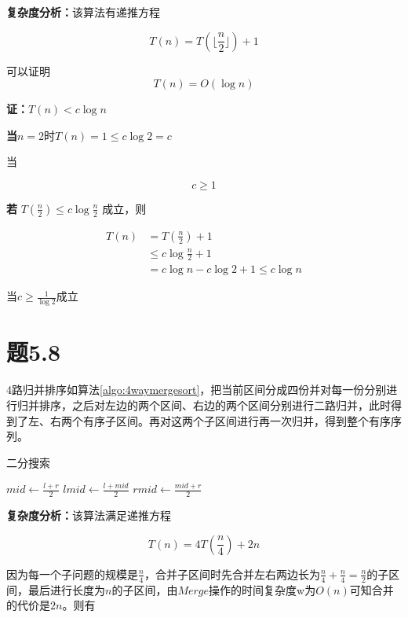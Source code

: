 \documentclass[a4paper,twoside]{article}
\begin{document}
\begin{spacing}{1.2}
\textbf{复杂度分析：}该算法有递推方程

$$
T(n)=T(\lfloor \frac{n}{2} \rfloor)+1
$$

可以证明
$$
T(n)=O(\log n)
$$

\textbf{证：}$T(n)<c\log n$

\textbf{当}$n=2$时$T(n)=1\le c\log2=c$

当

$$
c \ge 1
$$

\textbf{若}
$
T(\frac{n}{2}) \le c\log \frac{n}{2}
$
成立，则

\begin{align*}
	T(n)&=T(\frac{n}{2})+1 \\
	&\le c\log \frac{n}{2}+1 \\
	&= c\log n - c\log 2+1 \le c\log n
\end{align*}

当$
c \ge \frac{1}{\log 2}
$成立

\section{题5.8}

4路归并排序如算法\ref{algo:4waymergesort}，把当前区间分成四份并对每一份分别进行归并排序，之后对左边的两个区间、右边的两个区间分别进行二路归并，此时得到了左、右两个有序子区间。再对这两个子区间进行再一次归并，得到整个有序序列。

\begin{algorithm}
	\caption{二分搜索}
	\label{algo:4waymergesort}
	\begin{algorithmic}[1]
		\State $mid \gets \frac{l+r}{2} $
		\State $lmid \gets \frac{l+mid}{2}$
		\State $rmid \gets \frac{mid+r}{2}$
		
		\State {}
		\State {}
		\State {}
		\State {}
		
		\State {}
		\State {}
		\State {}
		
		\EndProcedure
	\end{algorithmic}
\end{algorithm}	

\textbf{复杂度分析：}该算法满足递推方程

$$
T(n)=4T(\frac{n}{4})+2n
$$

因为每一个子问题的规模是$\frac{n}{4}$，合并子区间时先合并左右两边长为$\frac{n}{4}+\frac{n}{4}=\frac{n}{2}$的子区间，最后进行长度为$n$的子区间，由$Merge$操作的时间复杂度w为$O(n)$可知合并的代价是$2n$。则有


\end{spacing}
\end{document}
